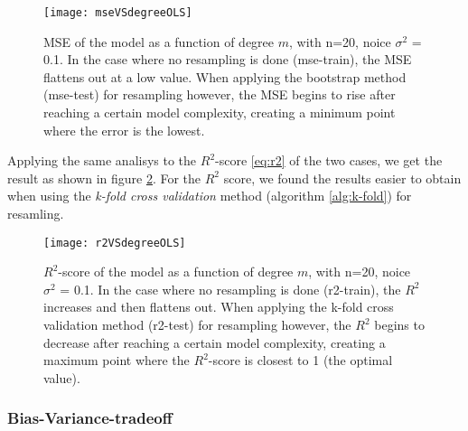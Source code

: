 \begin{figure}[htbp]
	\centering
	\texttt{[image: mseVSdegreeOLS]}
	\caption{MSE of the model as a function of degree $m$, with n=20, noice $\sigma^2$ = 0.1. In the case where no resampling is done (mse-train), the MSE flattens out at a low value. When applying the bootstrap method (mse-test) for resampling however, the MSE begins to rise after reaching a certain model complexity, creating a minimum point where the error is the lowest.}
	\label{fig:mseVSdegreeOLS}
\end{figure}

Applying the same analisys to the $R^2$-score \eqref{eq:r2} of the two cases, we get the result as shown in figure \ref{fig:r2VSdegreeOLS}. For the $R^2$ score, we found the results easier to obtain when using the \emph{k-fold cross validation} method (algorithm \ref{alg:k-fold}) for resamling.
\begin{figure}[htbp]
	\centering
	\texttt{[image: r2VSdegreeOLS]}
	\caption{$R^2$-score of the model as a function of degree $m$, with n=20, noice $\sigma^2$ = 0.1. In the case where no resampling is done (r2-train), the $R^2$ increases and then flattens out. When applying the k-fold cross validation method (r2-test) for resampling however, the $R^2$ begins to decrease after reaching a certain model complexity, creating a maximum point where the $R^2$-score is closest to 1 (the optimal value).}
	\label{fig:r2VSdegreeOLS}
\end{figure}

\subsubsection{Bias-Variance-tradeoff}

\vfill
\newpage
